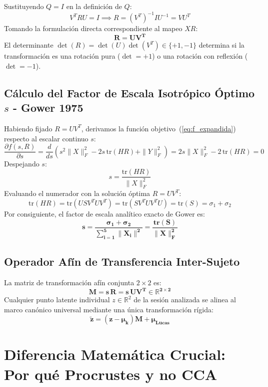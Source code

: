 \documentclass[11pt,a4paper,openany]{book}
\theoremstyle{definition}
\begin{document}
Sustituyendo $Q = I$ en la definición de $Q$:
$$V^T R U = I \implies R = (V^T)^{-1} I U^{-1} = V U^T$$
Tomando la formulación directa correspondiente al mapeo $X R$:
\begin{equation}
\mathbf{R = U V^T}
\label{eq:solucion_schonemann}
\end{equation}
El determinante $\det(R) = \det(U) \det(V^T) \in \{+1, -1\}$ determina si la transformación es una rotación pura ($\det = +1$) o una rotación con reflexión ($\det = -1$).

\subsection{Cálculo del Factor de Escala Isotrópico Óptimo \texorpdfstring{$s$}{s} - Gower 1975}
Habiendo fijado $R = U V^T$, derivamos la función objetivo~(\ref{eq:f_expandida}) respecto al escalar continuo $s$:
$$\frac{\partial f(s, R)}{\partial s} = \frac{d}{ds} \left( s^2 \|X\|_F^2 - 2s \, \text{tr}(H R) + \|Y\|_F^2 \right) = 2s \|X\|_F^2 - 2 \, \text{tr}(H R) = 0$$
Despejando $s$:
\begin{equation}
s = \frac{\text{tr}(H R)}{\|X\|_F^2}
\end{equation}
Evaluando el numerador con la solución óptima $R = U V^T$:
$$\text{tr}(H R) = \text{tr}(U S V^T U V^T) = \text{tr}(S V^T U V^T U) = \text{tr}(S) = \sigma_1 + \sigma_2$$
Por consiguiente, el factor de escala analítico exacto de Gower es:
\begin{equation}
\mathbf{s = \frac{\sigma_1 + \sigma_2}{\sum_{i=1}^5 \|X_i\|^2} = \frac{\text{tr}(S)}{\|X\|_F^2}}
\label{eq:solucion_gower}
\end{equation}

\subsection{Operador Afín de Transferencia Inter-Sujeto}
La matriz de transformación afín conjunta $2 \times 2$ es:
\begin{equation}
\mathbf{M = s \, R = s \, U V^T \in \mathbb{R}^{2 \times 2}}
\end{equation}
Cualquier punto latente individual $z \in \mathbb{R}^2$ de la sesión analizada se alinea al marco canónico universal mediante una única transformación rígida:
\begin{equation}
\mathbf{\tilde{z} = (z - \mu_k) M + \mu_{\text{Lucas}}}
\label{eq:proyeccion_final}
\end{equation}

\section{Diferencia Matemática Crucial: Por qué Procrustes y no CCA}
\label{sec:procrustes_no_cca}
\end{document}
